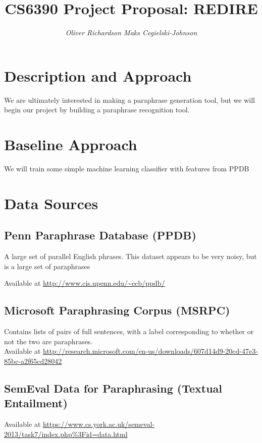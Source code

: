 \documentclass[11pt, reqno]{amsart}
\begin{document}
	\title{\LARGE CS6390 Project Proposal: REDIRE}
	\author{\it Oliver Richardson \hspace{2em} Maks Cegielski-Johnson }
	\maketitle 
	
	\vspace{-2em}
	
	\section{Description and Approach}
	We are ultimately interested in making a paraphrase generation tool, but we will begin our project by building a paraphrase recognition tool. 
	
	\section{Baseline Approach}
	We will train some simple machine learning classifier with features from PPDB 
	
	\section{Data Sources}
	\subsection{ Penn Paraphrase Database (PPDB)} 
	A large set of parallel English phrases. This dataset appears to be very noisy, but is a large set of paraphrases
	
	Available at \url{http://www.cis.upenn.edu/~ccb/ppdb/} 
		
	\subsection{Microsoft Paraphrasing Corpus (MSRPC) }
	Contains lists of pairs of full sentences, with a label corresponding to whether or not the two are paraphrases.\\
	Available at \url{http://research.microsoft.com/en-us/downloads/607d14d9-20cd-47e3-85bc-a2f65cd28042} 
	
	\subsection{SemEval Data for Paraphrasing (Textual Entailment) }
	
	Available at \url{https://www.cs.york.ac.uk/semeval-2013/task7/index.php%3Fid=data.html}
		
\end{document}
